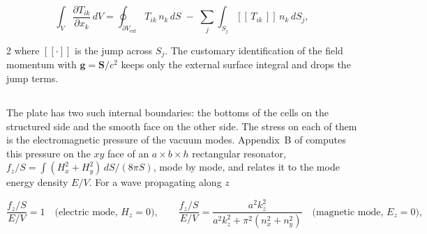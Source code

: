 \documentclass[twoside, 10pt]{article}
\def\myvspacebeforesubsection{-2.0mm}
\def\myvspaceaftersubsection{-2.5mm}
\begin{document}
\[
\int_V \frac{\partial T_{ik}}{\partial x_k}\,dV
= \oint_{\partial V_{\mathrm{ext}}} T_{ik}\,n_k\,dS
\;-\; \sum_j \int_{S_j} [\![\,T_{ik}\,]\!]\,n_k\,dS_j ,
\]
\begin{multicols}{2}
where $[\![\cdot]\!]$ is the jump across $S_j$. The customary identification of the
field momentum with $\mathbf{g}=\mathbf{S}/c^2$ keeps only the external surface
integral and drops the jump terms.

\vspace{\myvspacebeforesubsection}
\subsection*{}
\vspace{\myvspaceaftersubsection}

The plate has two such internal boundaries: the bottoms of the cells on the
structured side and the smooth face on the other side. The stress on each of them is
the electromagnetic pressure of the vacuum modes. Appendix~B of \cite{Drozdov2024}
computes this pressure on the $xy$ face of an $a\times b\times h$ rectangular
resonator, $f_z/S=\int(H_x^2+H_y^2)\,dS/(8\pi S)$, mode by mode, and relates it
to the mode energy density $E/V$. For a wave propagating along $z$
\end{multicols}
\[
\frac{f_z/S}{E/V}=1 \quad\text{(electric mode, } H_z=0\text{)},
\qquad
\frac{f_z/S}{E/V}=\frac{a^2k_z^2}{a^2k_z^2+\pi^2(n_x^2+n_y^2)} \quad\text{(magnetic mode, } E_z=0\text{)},
\]
\end{document}
